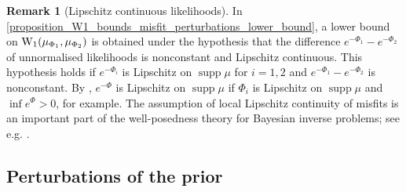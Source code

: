 \documentclass[a4paper]{scrartcl}
\theoremstyle{definition}
\newtheorem{remark}[theorem]{Remark}
\numberwithin{equation}{section}
\DeclareMathOperator{\supp}{supp}
\newcommand{\Was}[0]{\textup{W}}
\begin{document}
\begin{remark}[Lipschitz continuous likelihoods]
\label{remark_Lipschitz_continuity}
In \ref{proposition_W1_bounds_misfit_perturbations_lower_bound}, a lower bound on $\Was_1(\mu_{\Phi_1},\mu_{\Phi_2})$ is obtained under the hypothesis that the difference $e^{-\Phi_1}-e^{-\Phi_2}$ of unnormalised likelihoods is nonconstant and Lipschitz continuous.
This hypothesis holds if $e^{-\Phi_i}$ is Lipschitz on $\supp{\mu}$ for $i=1,2$ and $e^{-\Phi_1}-e^{-\Phi_2}$ is nonconstant.
By , $e^{-\Phi}$ is Lipschitz on $\supp{\mu}$ if $\Phi_i$ is Lipschitz on $\supp{\mu}$ and $\inf e^{\Phi}>0$, for example. 
The assumption of local Lipschitz continuity of misfits is an important part of the well-posedness theory for Bayesian inverse problems; see e.g. \cite[Assumption 2.6(iii)]{Stuart2010}. 
\end{remark}

\subsection{Perturbations of the prior}
\label{sectionW1bounds_prior_perturbations}
\end{document}
